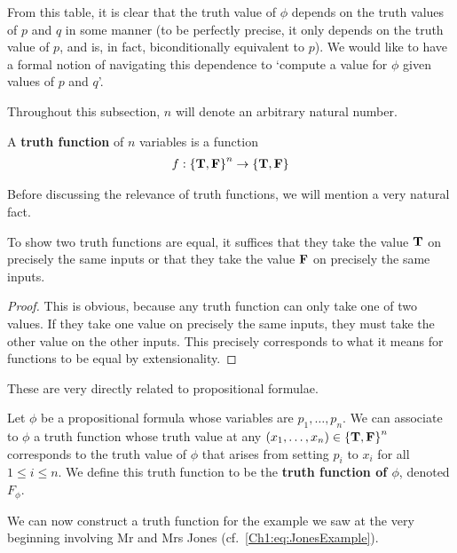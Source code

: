 From this table, it is clear that the truth value of $\phi$ depends on the truth values of $p$ and $q$ in some manner (to be perfectly precise, it only depends on the truth value of $p$, and is, in fact, biconditionally equivalent to $p$). We would like to have a formal notion of navigating this dependence to `compute a value for $\phi$ given values of $p$ and $q$'.

Throughout this subsection, $n$ will denote an arbitrary natural number.

\begin{boxdefinition}
    A \textbf{truth function} of $n$ variables is a function
    \begin{align*}
        f : \left\{ \mathbf{T}, \mathbf{F} \right\}^n \to \left\{ \mathbf{T}, \mathbf{F} \right\}
    \end{align*}
\end{boxdefinition}

Before discussing the relevance of truth functions, we will mention a very natural fact.

\begin{boxlemma}\label{Ch1:Lemma:TruthFunEq}
    To show two truth functions are equal, it suffices that they take the value $\mathbf{T}$ on precisely the same inputs or that they take the value $\mathbf{F}$ on precisely the same inputs.
\end{boxlemma}
\begin{proof}
    This is obvious, because any truth function can only take one of two values. If they take one value on precisely the same inputs, they must take the other value on the other inputs. This precisely corresponds to what it means for functions to be equal by extensionality.
\end{proof}

These are very directly related to propositional formulae.

\begin{boxdefinition}
    Let $\phi$ be a propositional formula whose variables are $p_1, \ldots, p_n$. We can associate to $\phi$ a truth function whose truth value at any $\left( x_1, \ldots, x_n \right) \in \left\{ \mathbf{T}, \mathbf{F} \right\}^n$ corresponds to the truth value of $\phi$ that arises from setting $p_i$ to $x_i$ for all $1 \leq i \leq n$. We define this truth function to be the \textbf{truth function of $\phi$}, denoted $F_{\phi}$.
\end{boxdefinition}

We can now construct a truth function for the example we saw at the very beginning involving Mr and Mrs Jones (cf.~\eqref{Ch1:eq:JonesExample}).

